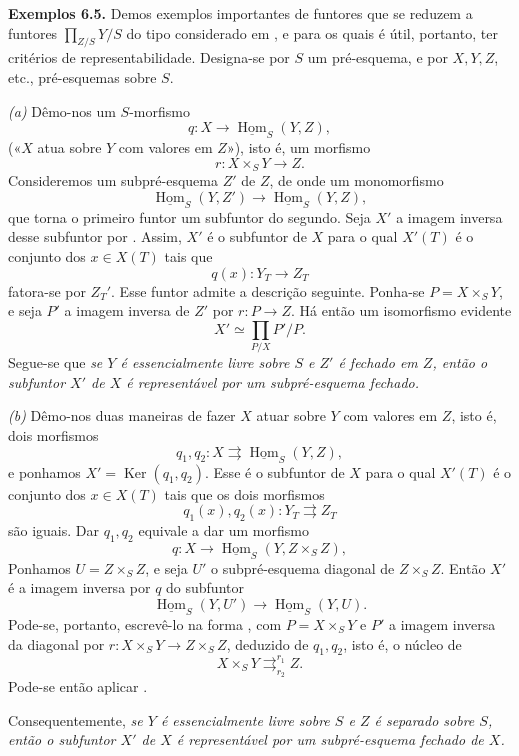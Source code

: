 \medskip
\noindent{}\textbf{Exemplos 6.5.}
Demos exemplos importantes de funtores que se reduzem a funtores
\(\prod_{Z/S}Y/S\) do tipo considerado em
, e para os quais é útil,
portanto, ter critérios de representabilidade. Designa-se por \(S\)
um pré-esquema, e por \(X,Y,Z\), etc., pré-esquemas sobre \(S\).

\smallskip
\noindent{}\textit{(a)}
Dêmo-nos um \(S\)-morfismo
\[
  q:X\longrightarrow\underline{\operatorname{Hom}}_S(Y,Z),
  \tag{x}\label{sga3:viii:examples:6:5:eq:x:01}
\]
(«\(X\) atua sobre \(Y\) com valores em \(Z\)»), isto é, um morfismo
\[
  r:X\times_SY\longrightarrow Z.
  \tag{xx}\label{sga3:viii:examples:6:5:eq:xx:01}
\]
Consideremos um subpré-esquema \(Z'\) de \(Z\), de onde um monomorfismo
\[
  \underline{\operatorname{Hom}}_S(Y,Z')
  \longrightarrow
  \underline{\operatorname{Hom}}_S(Y,Z),
\]
que torna o primeiro funtor um subfuntor do segundo. Seja \(X'\) a
imagem inversa desse subfuntor por
. Assim, \(X'\) é o
subfuntor de \(X\) para o qual \(X'(T)\) é o conjunto dos
\(x\in X(T)\) tais que
\[
  q(x):Y_T\longrightarrow Z_T
\]
fatora-se por \(Z_T'\). Esse funtor admite a descrição seguinte.
Ponha-se \(P=X\times_SY\), e seja \(P'\) a imagem inversa de \(Z'\) por
\(r:P\to Z\). Há então um isomorfismo evidente
\[
  X'\simeq\prod_{P/X}P'/P.
  \tag{xxx}\label{sga3:viii:examples:6:5:eq:xxx:01}
\]
Segue-se que \textit{se \(Y\) é essencialmente livre sobre \(S\) e \(Z'\)
é fechado em \(Z\), então o subfuntor \(X'\) de \(X\) é representável
por um subpré-esquema fechado.}

\smallskip
\noindent{}\textit{(b)}
Dêmo-nos duas maneiras de fazer \(X\) atuar sobre \(Y\) com valores em \(Z\),
isto é, dois morfismos
\[
  q_1,q_2:X\rightrightarrows
  \underline{\operatorname{Hom}}_S(Y,Z),
\]
e ponhamos \(X'=\operatorname{Ker}(q_1,q_2)\). Esse é o subfuntor de
\(X\) para o qual \(X'(T)\) é o conjunto dos \(x\in X(T)\) tais
que os dois morfismos
\[
  q_1(x),q_2(x):Y_T\rightrightarrows Z_T
\]
são iguais. Dar \(q_1,q_2\) equivale a dar um morfismo
\[
  q:X\longrightarrow
  \underline{\operatorname{Hom}}_S(Y,Z\times_SZ),
\]
Ponhamos \(U=Z\times_SZ\), e seja \(U'\) o subpré-esquema diagonal de
\(Z\times_SZ\). Então \(X'\) é a imagem inversa por \(q\) do
subfuntor
\[
  \underline{\operatorname{Hom}}_S(Y,U')
  \longrightarrow
  \underline{\operatorname{Hom}}_S(Y,U).
\]
Pode-se, portanto, escrevê-lo na forma
, com
\(P=X\times_SY\) e \(P'\) a imagem inversa da diagonal por
\(r:X\times_SY\to Z\times_SZ\), deduzido de \(q_1,q_2\), isto
é, o núcleo de
\[
  X\times_SY
  \mathop{\rightrightarrows}^{r_1}_{r_2}
  Z.
\]
Pode-se então aplicar
.

Consequentemente, \textit{se \(Y\) é essencialmente livre sobre \(S\) e
\(Z\) é separado sobre \(S\), então o subfuntor \(X'\) de \(X\) é
representável por um subpré-esquema fechado de \(X\).}
